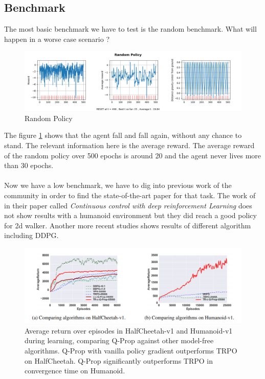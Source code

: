 \documentclass{article}
\begin{document}
\subsection{Benchmark}

The most basic benchmark we have to test is the random benchmark. What will
happen in a worse case scenario ? 

\begin{figure}[ht]
  \centering
  \includegraphics[width=\textwidth]{randompolicy}
  \caption{Random Policy}
  \label{fig:randompolicy}
\end{figure}

The figure \ref{fig:randompolicy} shows that the agent fall and fall again,
without any chance to stand. The relevant information here is the average
reward. The average reward of the random policy over 500 epochs is around 20 and
the agent never lives more than 30 epochs.
\paragraph{}
Now we have a low benchmark, we have to dig into previous work of the community
in order to find the state-of-the-art paper for that task. The work of
\citeauthor{journals/corr/LillicrapHPHETS15} in their paper called
\textit{Continuous control with deep reinforcement Learning} does not show
results with a humanoid environment but they did reach a good policy for 2d
walker. Another more recent studies\cite{GuLilGhaTurLev17} shows results of
different algorithm including DDPG. 

\begin{figure}[ht]
  \centering
  \includegraphics[width=\textwidth]{benchmark}
  \caption{Average return over episodes in HalfCheetah-v1 and Humanoid-v1 during
    learning, comparing Q-Prop against other model-free algorithms. Q-Prop with
    vanilla policy gradient outperforms TRPO on HalfCheetah. Q-Prop
    significantly outperforms TRPO in convergence time on Humanoid.}
  \label{fig:benchmark}
\end{figure}
\end{document}
